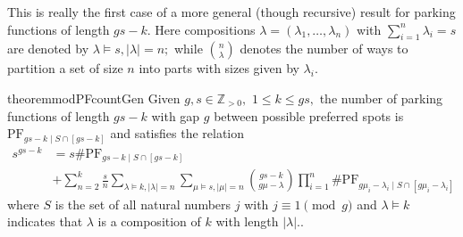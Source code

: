 \documentclass[12 pt]{amsart}
\theoremstyle{definition} %
\theoremstyle{remark} %
\begin{document}
This is really the first case of a more general (though recursive) result for parking functions of length $gs - k$. Here compositions $\lambda = (\lambda_{1}, \dots, \lambda_{n})$ with $\sum_{i = 1}^{n} \lambda_{i} = s$ are denoted by $\lambda\vDash s, \lvert\lambda\rvert = n;$ while $\binom{n}{\lambda}$ denotes the number of ways to partition a set of size $n$ into parts with sizes given by $\lambda_i$.

\begin{restatable}{theorem}{modPFcountGen}
	Given $g,s\in\mathbb{Z}_{>0},$ $1\le k\le gs,$ the number of parking functions of length $gs - k$ with gap $g$ between possible preferred spots is $\mathrm{PF}_{gs - k \mid S \cap [gs - k]}$ and satisfies the relation
	\begin{align*}
		s^{gs - k} & = s \# \mathrm{PF}_{gs - k \mid S \cap [gs - k]} \\
			   & + \sum_{n = 2}^{k} \frac{s}{n} \sum_{\lambda \vDash k, \lvert \lambda \rvert = n} \sum_{\mu \vDash s, \lvert \mu \rvert = n} \binom{gs - k}{g \mu - \lambda} \prod_{i = 1}^{n} \# \mathrm{PF}_{g \mu_{i} - \lambda_{i} \mid S \cap [g \mu_{i} - \lambda_{i}]}
	\end{align*}
	where $S$ is the set of all natural numbers $j$ with $j \equiv 1 \pmod g$ and $\lambda \vDash k$ indicates that $\lambda$ is a composition of $k$ with length $|\lambda|.$.
\end{restatable}
\end{document}
